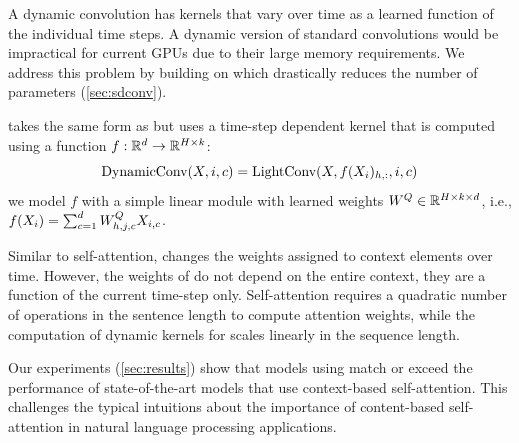 
A dynamic convolution has kernels that vary over time as a learned function of the individual time steps.
A dynamic version of standard convolutions would be impractical for current GPUs due to their large memory requirements.
We address this problem by building on \sdconv{} which drastically reduces the number of parameters (\textsection\ref{sec:sdconv}). 

\newterm{\tvsdconv{}} takes the same form as \sdconv{} but uses a time-step dependent kernel that is computed using a function $f:\mathbb{R}^{d}\to \mathbb{R}^{H \times k}$:
\[
\text{DynamicConv{}}(X, i, c) = \text{LightConv{}}(X, f({X}_i)_{h,:}, i, c)
\]
we model $f$ with a simple linear module with learned weights ${W}^Q \in \mathbb{R}^{H \times k \times d}$, i.e.,
$ f({X}_i) = \sum_{c=1}^d {W}^Q_{h, j, c} {X}_{i, c}$. 

Similar to self-attention, \tvsdconv{} changes the weights assigned to context elements over time.
However, the weights of \tvsdconv{} do not depend on the entire context, they are a function of the current time-step only.
Self-attention requires a quadratic number of operations in the sentence length to compute attention weights, while the computation of dynamic kernels for \tvsdconv{} scales linearly in the sequence length. 

Our experiments (\textsection\ref{sec:results}) show that models using \tvsdconv{} match or exceed the performance of state-of-the-art models that use context-based self-attention. 
This challenges the typical intuitions about the importance of content-based self-attention in natural language processing applications.

